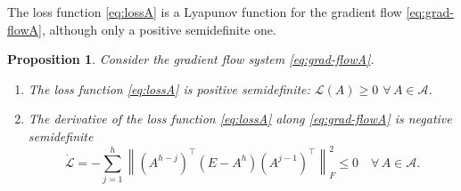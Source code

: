 \documentclass{article}
\newtheorem{proposition}{Proposition}
\newcommand{\1}{\mathds{1}}
\newcommand{\benu}{\begin{enumerate}}
\newcommand{\eenu}{\end{enumerate}}
\begin{document}
The loss function \eqref{eq:lossA} is a Lyapunov function for the gradient flow \eqref{eq:grad-flowA}, although only a positive semidefinite one. 

\begin{proposition}
\label{prop:Layp1}
Consider the gradient flow system \eqref{eq:grad-flowA}.
\benu
\item The loss function \eqref{eq:lossA} is positive semidefinite: $ \mathcal{L}(A) \geq 0 $ $ \forall \, A \in \mathcal{A}$. 
\item The derivative of the loss function \eqref{eq:lossA} along  \eqref{eq:grad-flowA} is negative semidefinite
\begin{equation}
\label{eq:dotL2}
\dot{\mathcal{L}} 
 = -  \sum_{j=1}^h \left\| \left(A^{h-j}\right)^\top \left( E - A^h \right) \left( A^{j-1}  \right) ^\top \right\|_F^2  \leq 0 \quad \forall \, A \in \mathcal{A}.
\end{equation}
\eenu
\end{proposition}
\end{document}
